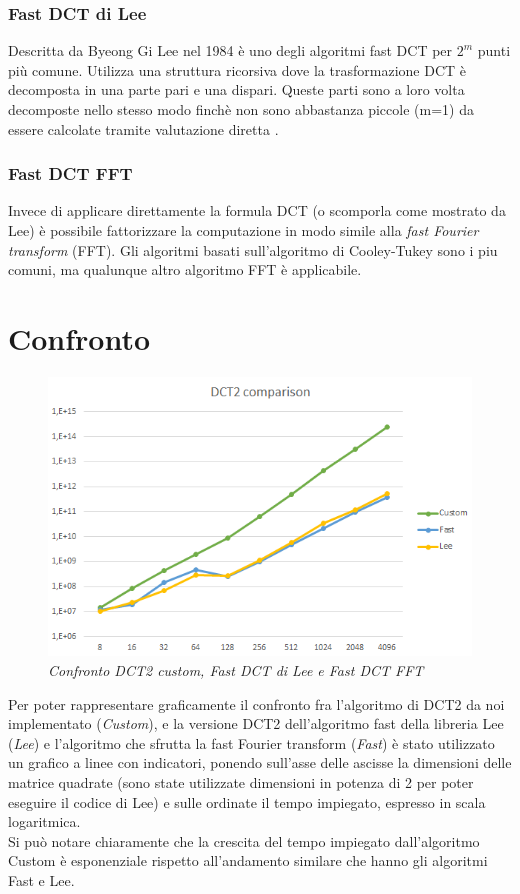 \documentclass[a4paper,12pt]{report}
\begin{document}
\subsubsection*{Fast DCT di Lee}
Descritta da Byeong Gi Lee \cite{Lee} nel 1984 è uno degli algoritmi fast DCT per \(2^m\) punti più comune. Utilizza una struttura ricorsiva dove la trasformazione DCT è decomposta in una parte pari e una dispari. Queste parti sono a loro volta decomposte nello stesso modo finchè non sono abbastanza piccole (m=1) da essere calcolate tramite valutazione diretta \cite{LAGERSTRM2001DesignAI}.

\subsubsection*{Fast DCT FFT}
Invece di applicare direttamente la formula DCT (o scomporla come mostrato da Lee) è possibile fattorizzare la computazione in modo simile alla \textit{fast Fourier transform} (FFT). Gli algoritmi basati sull'algoritmo di Cooley-Tukey \cite{10.2307/2003354} sono i piu comuni, ma qualunque altro algoritmo FFT è applicabile. 

\section{Confronto}
\begin{figure}[H]
\centering
\includegraphics[width=0.77\linewidth]{../img/comparison.png}
\caption{\textit{Confronto DCT2 custom, Fast DCT di Lee e Fast DCT FFT}}
\end{figure}
Per poter rappresentare graficamente il confronto fra l'algoritmo di DCT2 da noi implementato (\textit{Custom}), e la versione DCT2 dell'algoritmo fast della libreria Lee (\textit{Lee}) e l'algoritmo che sfrutta la fast Fourier transform (\textit{Fast}) è stato utilizzato un grafico a linee con indicatori, ponendo sull'asse delle ascisse la dimensioni delle matrice quadrate (sono state utilizzate dimensioni in potenza di 2 per poter eseguire il codice di Lee) e sulle ordinate il tempo impiegato, espresso in scala logaritmica. \\
Si può notare chiaramente che la crescita del tempo impiegato dall'algoritmo Custom è esponenziale rispetto all'andamento similare che hanno gli algoritmi Fast e Lee. 
\end{document}
